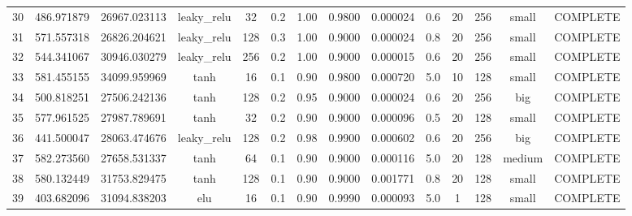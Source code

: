 \begin{longtable}{cccccccccccccc}
                       30 &                 486.971879 &                       26967.023113 &     leaky\_relu &          32 &         0.2 &        1.00 & 0.9800 &       0.000024 &             0.6 &        20 &      256 &     small & COMPLETE \\
                       31 &                 571.557318 &                       26826.204621 &     leaky\_relu &         128 &         0.3 &        1.00 & 0.9000 &       0.000024 &             0.8 &        20 &      256 &     small & COMPLETE \\
                       32 &                 544.341067 &                       30946.030279 &     leaky\_relu &         256 &         0.2 &        1.00 & 0.9000 &       0.000015 &             0.6 &        20 &      256 &     small & COMPLETE \\
                       33 &                 581.455155 &                       34099.959969 &            tanh &          16 &         0.1 &        0.90 & 0.9800 &       0.000720 &             5.0 &        10 &      128 &     small & COMPLETE \\
                       34 &                 500.818251 &                       27506.242136 &            tanh &         128 &         0.2 &        0.95 & 0.9000 &       0.000024 &             0.6 &        20 &      256 &       big & COMPLETE \\
                       35 &                 577.961525 &                       27987.789691 &            tanh &          32 &         0.2 &        0.90 & 0.9000 &       0.000096 &             0.5 &        20 &      128 &     small & COMPLETE \\
                       36 &                 441.500047 &                       28063.474676 &     leaky\_relu &         128 &         0.2 &        0.98 & 0.9900 &       0.000602 &             0.6 &        20 &      256 &       big & COMPLETE \\
                       37 &                 582.273560 &                       27658.531337 &            tanh &          64 &         0.1 &        0.90 & 0.9000 &       0.000116 &             5.0 &        20 &      128 &    medium & COMPLETE \\
                       38 &                 580.132449 &                       31753.829475 &            tanh &         128 &         0.1 &        0.90 & 0.9000 &       0.001771 &             0.8 &        20 &      128 &     small & COMPLETE \\
                       39 &                 403.682096 &                       31094.838203 &             elu &          16 &         0.1 &        0.90 & 0.9990 &       0.000093 &             5.0 &         1 &      128 &     small & COMPLETE \\

\end{longtable}
